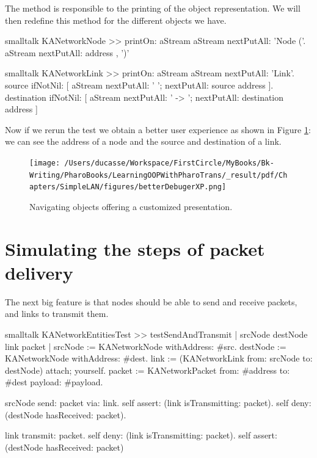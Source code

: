 \documentclass[10pt,twoside,english]{_support/latex/sbabook/sbabook}
\begin{document}
The method  is responsible to the printing of the object representation. We will then redefine this method for the different objects we have.

\begin{displaycode}{smalltalk}
KANetworkNode >> printOn: aStream
	aStream nextPutAll: 'Node ('.
	aStream nextPutAll: address , ')'
\end{displaycode}

\begin{displaycode}{smalltalk}
KANetworkLink >> printOn: aStream
	aStream nextPutAll: 'Link'.
	source
		ifNotNil: [ aStream
				nextPutAll: ' ';
				nextPutAll: source address ].
	destination
		ifNotNil: [ aStream
				nextPutAll: ' -> ';
				nextPutAll: destination address ]
\end{displaycode}

Now if we rerun the test we obtain a better user experience as shown in Figure \ref{debuggerXP}: we can see the address of a node and the source and destination of a link.


\begin{figure}

\begin{center}
\texttt{[image: /Users/ducasse/Workspace/FirstCircle/MyBooks/Bk-Writing/PharoBooks/LearningOOPWithPharoTrans/\_result/pdf/Chapters/SimpleLAN/figures/betterDebugerXP.png]}\caption{Navigating objects offering a customized presentation.\label{debuggerXP}}\end{center}
\end{figure}

\section{Simulating the steps of packet delivery}
The next big feature is that nodes should be able to send and receive packets, and links to transmit them.

\begin{displaycode}{smalltalk}
KANetworkEntitiesTest >> testSendAndTransmit
    | srcNode destNode link packet |
    srcNode := KANetworkNode withAddress: #src.
    destNode := KANetworkNode withAddress: #dest.
    link := (KANetworkLink from: srcNode to: destNode) attach; yourself.
    packet := KANetworkPacket from: #address to: #dest payload: #payload.

    srcNode send: packet via: link.
    self assert: (link isTransmitting: packet).
    self deny: (destNode hasReceived: packet).

    link transmit: packet.
    self deny: (link isTransmitting: packet).
    self assert: (destNode hasReceived: packet)
\end{displaycode}
\end{document}
